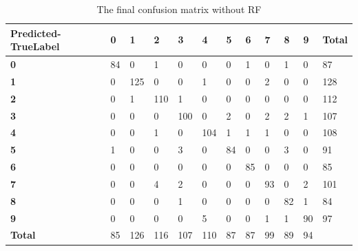 \begin{table}[]
  \centering
\caption{The final confusion matrix without RF}
\label{confusion_matrix}
\begin{tabular}{|l|l|l|l|l|l|l|l|l|l|l|l|}
\hline
\textbf{Predicted-TrueLabel} & \textbf{0} & \textbf{1} & \textbf{2} & \textbf{3} & \textbf{4} & \textbf{5} & \textbf{6} & \textbf{7} & \textbf{8} & \textbf{9} & \textbf{Total} \\ \hline
\textbf{0}                   & 84         & 0          & 1          & 0          & 0          & 0          & 1          & 0          & 1          & 0          & 87             \\ \hline
\textbf{1}                   & 0          & 125        & 0          & 0          & 1          & 0          & 0          & 2          & 0          & 0          & 128            \\ \hline
\textbf{2}                   & 0          & 1          & 110        & 1          & 0          & 0          & 0          & 0          & 0          & 0          & 112            \\ \hline
\textbf{3}                   & 0          & 0          & 0          & 100        & 0          & 2          & 0          & 2          & 2          & 1          & 107            \\ \hline
\textbf{4}                   & 0          & 0          & 1          & 0          & 104        & 1          & 1          & 1          & 0          & 0          & 108            \\ \hline
\textbf{5}                   & 1          & 0          & 0          & 3          & 0          & 84         & 0          & 0          & 3          & 0          & 91             \\ \hline
\textbf{6}                   & 0          & 0          & 0          & 0          & 0          & 0          & 85         & 0          & 0          & 0          & 85             \\ \hline
\textbf{7}                   & 0          & 0          & 4          & 2          & 0          & 0          & 0          & 93         & 0          & 2          & 101            \\ \hline
\textbf{8}                   & 0          & 0          & 0          & 1          & 0          & 0          & 0          & 0          & 82         & 1          & 84             \\ \hline
\textbf{9}                   & 0          & 0          & 0          & 0          & 5          & 0          & 0          & 1          & 1          & 90         & 97             \\ \hline
\textbf{Total}               & 85         & 126        & 116        & 107        & 110        & 87         & 87         & 99         & 89         & 94         &                \\ \hline
\end{tabular}
\end{table}

